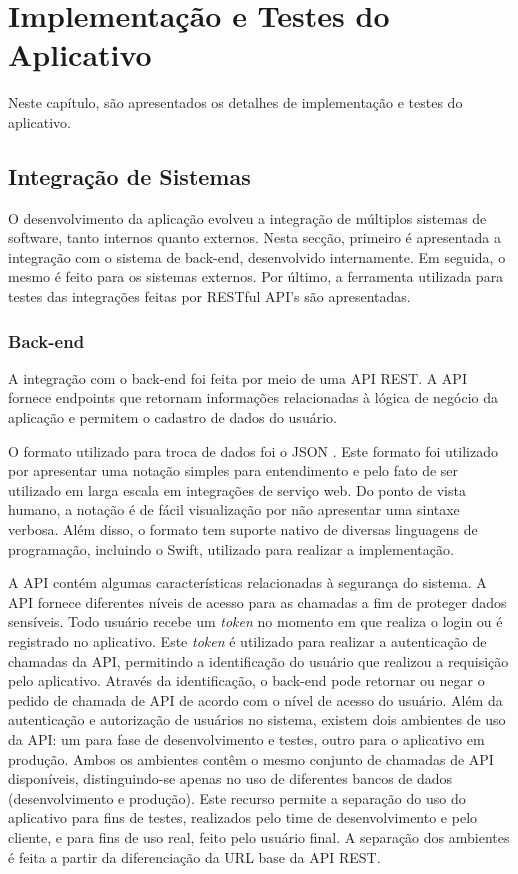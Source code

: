 \chapter{Implementação e Testes do Aplicativo} \label{cap:development}
Neste capítulo, são apresentados os detalhes de implementação e testes do aplicativo. 

\section{Integração de Sistemas}
O desenvolvimento da aplicação evolveu a integração de múltiplos sistemas de software, tanto internos quanto externos. Nesta secção, primeiro é apresentada a integração com o sistema de back-end, desenvolvido internamente. Em seguida, o mesmo é feito para os sistemas externos. Por último, a ferramenta utilizada para testes das integrações feitas por RESTful API's são apresentadas. 

\subsection{Back-end}
A integração com o back-end foi feita por meio de uma API REST. A API fornece endpoints que retornam informações relacionadas à lógica de negócio da aplicação e permitem o cadastro de dados do usuário.

O formato utilizado para troca de dados foi o JSON . Este formato foi utilizado por apresentar uma notação simples para entendimento e pelo fato de ser utilizado em larga escala em integrações de serviço web. Do ponto de vista humano, a notação é de fácil visualização por não apresentar uma sintaxe verbosa. Além disso, o formato tem suporte nativo de diversas linguagens de programação, incluindo o Swift, utilizado para realizar a implementação.


A API contém algumas características relacionadas à segurança do sistema. A API fornece diferentes níveis de acesso para as chamadas a fim de proteger dados sensíveis. Todo usuário recebe um \textit{token} no momento em que realiza o login ou é registrado no aplicativo. Este \textit{token} é utilizado para realizar a autenticação de chamadas da API, permitindo a identificação do usuário que realizou a requisição pelo aplicativo. Através da identificação, o back-end pode retornar ou negar o pedido de chamada de API de acordo com o nível de acesso do usuário. Além da autenticação e autorização de usuários no sistema, existem dois ambientes de uso da API: um para fase de desenvolvimento e testes, outro para o aplicativo em produção. Ambos os ambientes contêm o mesmo conjunto de chamadas de API disponíveis, distinguindo-se apenas no uso de diferentes bancos de dados (desenvolvimento e produção). Este recurso permite a separação do uso do aplicativo para fins de testes, realizados pelo time de desenvolvimento e pelo cliente, e para fins de uso real, feito pelo usuário final. A separação dos ambientes é feita a partir da diferenciação da URL base da API REST.

